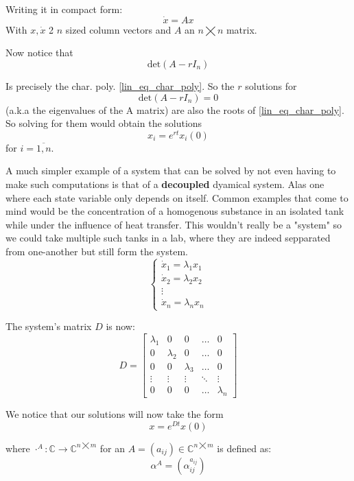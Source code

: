 Writing it in compact form:
\[
  \dot{x} = A x
\]
With $x, \dot{x}$ 2 $n$ sized column vectors and $A$ an $n \bigtimes n$ matrix.

Now notice that
\[
  \text{det}(A- r I_n)
\]

Is precisely the char. poly. \ref{lin_eq_char_poly}. So the $r$ solutions for
\[
  \text{det}(A - r I_n) =0
\]
(a.k.a the eigenvalues of the A matrix) are also the roots of \ref{lin_eq_char_poly}. So solving for them would obtain the solutions
\[
  x_i = e^{rt}x_i(0)
\]
for $i = \overline{1,n}$.

A much simpler example of a system that can be solved by not even having to make such computations is that of a \textbf{decoupled} dyamical system. Alas one where each state variable only depends on itself. Common examples that come to mind would be the concentration of a homogenous substance in an isolated tank while under the influence of heat transfer. This wouldn't really be a "system" so we could take multiple such tanks in a lab, where they are indeed sepparated from one-another but still form the system.
\begin{equation*}
  \begin{cases}
    \dot{x}_1 = \lambda_1 x_1 \\
    \dot{x}_2 = \lambda_2 x_2 \\
    \vdots \\
    \dot{x}_n = \lambda_n x_n
  \end{cases}
\end{equation*}

The system's matrix $D$ is now:
\begin{equation*}
  D =
  \begin{bmatrix}
    \lambda_1 & 0 & 0 &\dots & 0 \\
    0 & \lambda_2 & 0 & \dots & 0 \\
    0 & 0 & \lambda_3 & \dots & 0 \\
    \vdots & \vdots & \vdots & \ddots & \vdots \\
    0 & 0 & 0 & \dots & \lambda_n
  \end{bmatrix}
\end{equation*}

We notice that our solutions will now take the form
\[
  x = e^{Dt}x(0)
\]

where $\cdot^A : \mathbb{C} \rightarrow \mathbb{C}^{n \bigtimes m}$ for an $A = (a_{ij}) \in \mathbb{C}^{n \bigtimes m}$ is defined as:
\[
  \alpha^A = (\alpha^{a_{ij}}_{ij})
\]

